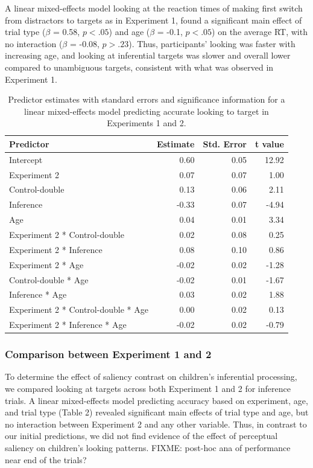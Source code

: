 \documentclass[a4paper,man,apacite,floatsintext]{apa6}
\begin{document}
A linear mixed-effects model looking at the reaction times of making
first switch from distractors to targets as in Experiment 1, found a
significant main effect of trial type (\(\beta\) = 0.58, \(p <.05\)) and
age (\(\beta\) = -0.1, \(p <.05\)) on the average RT, with no
interaction (\(\beta\) = -0.08, \(p >.23\)). Thus, participants' looking
was faster with increasing age, and looking at inferential targets was
slower and overall lower compared to unambiguous targets, consistent
with what was observed in Experiment 1.

\begin{table}[tb]
\centering
\begin{tabular}{lrrr}
 Predictor & Estimate & Std. Error & t value \\ 
  \hline
Intercept & 0.60 & 0.05 & 12.92 \\ 
  Experiment 2 & 0.07 & 0.07 & 1.00 \\ 
  Control-double & 0.13 & 0.06 & 2.11 \\ 
  Inference & -0.33 & 0.07 & -4.94 \\ 
  Age & 0.04 & 0.01 & 3.34 \\ 
  Experiment 2 * Control-double & 0.02 & 0.08 & 0.25 \\ 
  Experiment 2 * Inference & 0.08 & 0.10 & 0.86 \\ 
  Experiment 2 * Age & -0.02 & 0.02 & -1.28 \\ 
  Control-double * Age & -0.02 & 0.01 & -1.67 \\ 
  Inference * Age & 0.03 & 0.02 & 1.88 \\ 
  Experiment 2 * Control-double * Age & 0.00 & 0.02 & 0.13 \\ 
  Experiment 2 * Inference * Age & -0.02 & 0.02 & -0.79 \\ 
   \hline
\end{tabular}
\caption{Predictor estimates with standard errors and significance information for a linear mixed-effects model predicting accurate looking to target in Experiments 1 and 2.} 
\label{tab:exp2_tab}
\end{table}

\subsubsection{Comparison between Experiment 1 and
2}\label{comparison-between-experiment-1-and-2}

To determine the effect of saliency contrast on children's inferential
processing, we compared looking at targets across both Experiment 1 and
2 for inference trials. A linear mixed-effects model predicting accuracy
based on experiment, age, and trial type (Table 2) revealed significant
main effects of trial type and age, but no interaction between
Experiment 2 and any other variable. Thus, in contrast to our initial
predictions, we did not find evidence of the effect of perceptual
saliency on children's looking patterns. FIXME: post-hoc ana of
performance near end of the trials?
\end{document}
